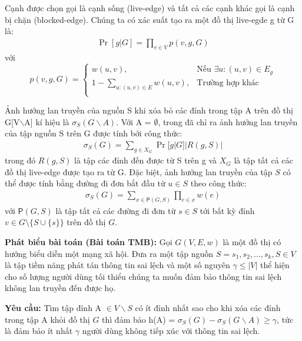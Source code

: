 Cạnh được chọn gọi là cạnh sống (live-edge) và tất cả các cạnh khác gọi là cạnh bị chặn (blocked-edge). Chúng ta có xác suất tạo ra một đồ thị live-egde g từ G là:
\begin{align}
\Pr[g|G]=\prod_{v \in V}{p(v,g,G)}
\end{align}
với
\begin{equation}
p(v, g, G)= \left\{ \begin{array}{ll}
w(u, v), & \mbox{Nếu $\exists u: (u, v) \in E_g$}\\
1-\sum_{u:(u, v) \in E}{w(u, v)}, & \mbox{Trường hợp khác}\\
\end{array} \right.
\end{equation}

Ảnh hưởng lan truyền của nguồn S khi xóa bỏ các đỉnh trong tập A trên đồ thị G[V$\backslash$A] kí hiệu là $\sigma_{S}(G \backslash A)$. Với A = $\emptyset$, trong \cite{kemple1} đã chỉ ra ảnh hưởng lan truyền của tập nguồn S trên G được tính bởi công thức:
\begin{align}
\sigma_S(G)=\sum_{g \in X_G}{\Pr[g|G]|R(g, S)|}
\label{inf_cal}
\end{align}
trong đó $R(g, S)$ là tập các đỉnh đến được từ S trên g và $X_G$ là tập tất cả các đồ thị live-edge được tạo ra từ G. Đặc biệt, ảnh hưởng lan truyền của tập $S$ có thể được tính bằng đường đi đơn bắt đầu từ $u \in S$ theo công thức: 
\begin{align}
\sigma_{S}(G)=\sum_{x \in \mathsf{P}(G, S)} \prod_{e \in x}w(e)
\label{inf_path}
\end{align} 				
với $\mathsf{P}(G, S)$ là tập tất cả các đường đi đơn từ $s \in S$ tới bất kỳ đỉnh $v \in G \setminus \{S \cup \{s\} \} $ trên đồ thị $G$.		

\textbf{Phát biểu bài toán (Bài toán TMB):} Gọi $G(V,E,w)$ là một đồ thị có hướng biểu diễn một mạng xã hội. Đưa ra một tập nguồn $S = {s_{1}, s_{2}, ... , s_{k}}, S \in V$ là tập tiềm năng phát tán thông tin sai lệch và một số nguyên $\gamma \leq | V |$ thể hiện cho số lượng người dùng tối thiểu chúng ta muốn đảm bảo thông tin sai lệch không lan truyền đến được họ.

\textbf{Yêu cầu:} Tìm tập đỉnh A $\in V \backslash S$ có ít đỉnh nhất sao cho khi xóa các đỉnh trong tập A khỏi đồ thị $G$ thì đảm bảo h(A) = $\sigma_{S}(G) - \sigma_{S}(G \backslash A) \geq \gamma$, tức là đảm bảo ít nhất $\gamma$ người dùng không tiếp xúc với thông tin sai lệch.
